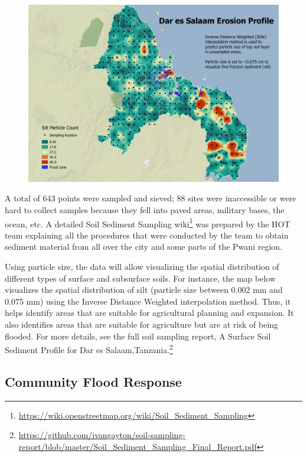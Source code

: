 \documentclass[a4paper,12pt,twoside]{article}
\begin{document}
\begin{figure}[h]
    \centering
    \includegraphics[width=.7\textwidth]{images/erosion_Sep26_min.png}
    \label{fig:my_label}
\end{figure}

\begin{multicols}{2}
A total of 643 points were sampled and sieved; 88 sites were inaccessible or were hard to collect samples because they fell into paved areas, military bases, the ocean, etc. A detailed Soil Sediment Sampling wiki\footnote{\url{ https://wiki.openstreetmap.org/wiki/Soil_Sediment_Sampling}} was prepared by the HOT team explaining all the procedures that were conducted by the team to obtain sediment material from all over the city and some parts of the Pwani region.

Using particle size, the data will allow visualizing the spatial distribution of different types of surface and subsurface soils. For instance, the map below visualizes the spatial distribution of silt (particle size between 0.002 mm and 0.075 mm) using the Inverse Distance Weighted interpolation method. Thus, it helps identify areas that are suitable for agricultural planning and expansion. It also identifies areas that are suitable for agriculture but are at risk of being flooded. For more details, see the full soil sampling report, A Surface Soil Sediment Profile for Dar es
Salaam,Tanzania.\footnote{\url{https://github.com/ivangayton/soil-sampling-report/blob/master/Soil_Sediment_Sampling_Final_Report.pdf}}
\end{multicols}
\newpage
\setlength{\parskip}{0.7em}
\subsection{Community Flood Response}
\end{document}
